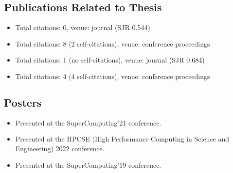 \begin{refsection}
\renewcommand*{\mkbibnamegiven}[1]{%
	\ifitemannotation{highlight}
	{\textbf{#1}}
	{#1}}

\renewcommand*{\mkbibnamefamily}[1]{%
	\ifitemannotation{highlight}
	{\textbf{#1}}
	{#1}}

\section*{Publications Related to Thesis}
	\begin{itemize}
		\item{}\par{}Total citations: 0, venue: journal (SJR 0.544)
		\item{}\par{}Total citations: 8 (2 self-citations), venue: conference proceedings
		\item{}\par{}Total citations: 1 (no self-citations), venue: journal (SJR 0.684)
		\item{}\par{}Total citations: 4 (4 self-citations), venue: conference proceedings
	\end{itemize}

	\subsection*{Posters}
	\begin{itemize}
		\item{}\par{}Presented at the SuperComputing'21 conference.
		\item{}\par{}Presented at the HPCSE (High Performance
		Computing in Science and Engineering) 2022 conference.
		\item{}\par{}Presented at the SuperComputing'19 conference.
	\end{itemize}


\end{refsection}
